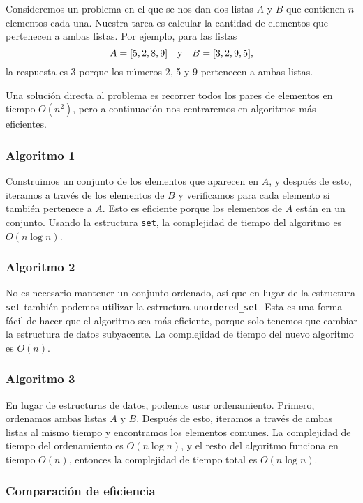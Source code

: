 Consideremos un problema en el que
se nos dan dos listas $A$ y $B$
que contienen $n$ elementos cada una.
Nuestra tarea es calcular la cantidad de elementos
que pertenecen a ambas listas.
Por ejemplo, para las listas
\[A = [5,2,8,9] \hspace{10px} \textrm{y} \hspace{10px} B = [3,2,9,5],\]
la respuesta es 3 porque los números 2, 5
y 9 pertenecen a ambas listas.

Una solución directa al problema es
recorrer todos los pares de elementos en tiempo $O(n^2)$,
pero a continuación nos centraremos en
algoritmos más eficientes.

\subsubsection{Algoritmo 1}

Construimos un conjunto de los elementos que aparecen en $A$,
y después de esto, iteramos a través de los elementos
de $B$ y verificamos para cada elemento si también
pertenece a $A$.
Esto es eficiente porque los elementos de $A$
están en un conjunto.
Usando la estructura \texttt{set},
la complejidad de tiempo del algoritmo es $O(n \log n)$.

\subsubsection{Algoritmo 2}

No es necesario mantener un conjunto ordenado,
así que en lugar de la estructura \texttt{set}
también podemos utilizar la estructura \texttt{unordered\_set}.
Esta es una forma fácil de hacer que el algoritmo
sea más eficiente, porque solo tenemos que cambiar
la estructura de datos subyacente.
La complejidad de tiempo del nuevo algoritmo es $O(n)$.

\subsubsection{Algoritmo 3}

En lugar de estructuras de datos, podemos usar ordenamiento.
Primero, ordenamos ambas listas $A$ y $B$.
Después de esto, iteramos a través de ambas listas
al mismo tiempo y encontramos los elementos comunes.
La complejidad de tiempo del ordenamiento es $O(n \log n)$,
y el resto del algoritmo funciona en tiempo $O(n)$,
entonces la complejidad de tiempo total es $O(n \log n)$.

\subsubsection{Comparación de eficiencia}

